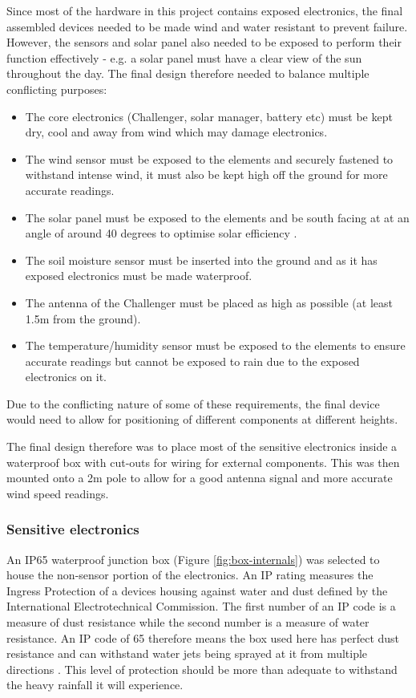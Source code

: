 Since most of the hardware in this project contains exposed electronics, the
final assembled devices needed to be made wind and water resistant to prevent
failure. However, the sensors and solar panel also needed to be exposed to
perform their function effectively - e.g. a solar panel must have a clear view
of the sun throughout the day. The final design therefore needed to balance
multiple conflicting purposes:

\begin{itemize}
    \item The core electronics (Challenger, solar manager, battery etc) must be
          kept dry, cool and away from wind which may damage electronics.
    \item The wind sensor must be exposed to the elements and securely fastened
          to withstand intense wind, it must also be kept high off the ground
          for more accurate readings.
    \item The solar panel must be exposed to the elements and be south facing at
          at an angle of around 40 degrees to optimise solar efficiency
          \cite{cathcart_best-solar-panel_2025}.
    \item The soil moisture sensor must be inserted into the ground and as it
          has exposed electronics must be made waterproof.
    \item The antenna of the Challenger must be placed as high as possible (at
          least 1.5m from the ground).
    \item The temperature/humidity sensor must be exposed to the elements to
          ensure accurate readings but cannot be exposed to rain due to the
          exposed electronics on it.
\end{itemize}

Due to the conflicting nature of some of these requirements, the final device
would need to allow for positioning of different components at different
heights.

The final design therefore was to place most of the sensitive electronics inside
a waterproof box with cut-outs for wiring for external components. This was then
mounted onto a 2m pole to allow for a good antenna signal and more accurate wind
speed readings.

\subsubsection{Sensitive electronics}

An IP65 waterproof junction box (Figure \ref{fig:box-internals}) was selected to
house the non-sensor portion of the electronics. An IP rating measures the
Ingress Protection of a devices housing against water and dust defined by the
International Electrotechnical Commission. The first number of an IP code is a
measure of dust resistance while the second number is a measure of water
resistance. An IP code of 65 therefore means the box used here has perfect dust
resistance and can withstand water jets being sprayed at it from multiple
directions \cite{wiki-ip}. This level of protection should be more than adequate
to withstand the heavy rainfall it will experience.

